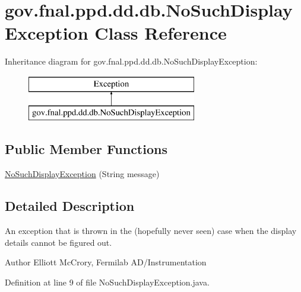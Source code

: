 \hypertarget{classgov_1_1fnal_1_1ppd_1_1dd_1_1db_1_1NoSuchDisplayException}{\section{gov.\-fnal.\-ppd.\-dd.\-db.\-No\-Such\-Display\-Exception Class Reference}
\label{classgov_1_1fnal_1_1ppd_1_1dd_1_1db_1_1NoSuchDisplayException}
}
Inheritance diagram for gov.\-fnal.\-ppd.\-dd.\-db.\-No\-Such\-Display\-Exception\-:\begin{figure}[H]
\begin{center}
\leavevmode
\includegraphics[height=2.000000cm]{classgov_1_1fnal_1_1ppd_1_1dd_1_1db_1_1NoSuchDisplayException}
\end{center}
\end{figure}
\subsection*{Public Member Functions}
\begin{DoxyCompactItemize}
\item 
\hyperlink{classgov_1_1fnal_1_1ppd_1_1dd_1_1db_1_1NoSuchDisplayException_a146774399d8da17cc34caed0f073d072}{No\-Such\-Display\-Exception} (String message)
\end{DoxyCompactItemize}


\subsection{Detailed Description}
An exception that is thrown in the (hopefully never seen) case when the display details cannot be figured out.

\begin{DoxyAuthor}{Author}
Elliott Mc\-Crory, Fermilab A\-D/\-Instrumentation 
\end{DoxyAuthor}


Definition at line 9 of file No\-Such\-Display\-Exception.\-java.



